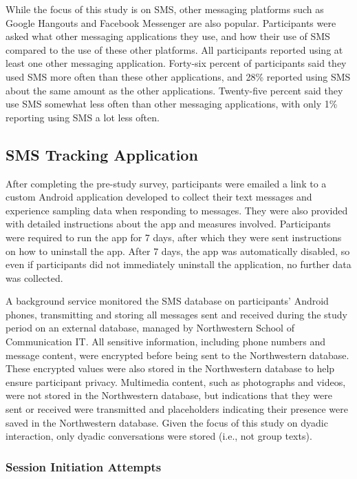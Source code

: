 \documentclass[12pt]{nuthesis}	%
\begin{document}
While the focus of this study is on SMS, other messaging platforms such as Google Hangouts and Facebook Messenger are also popular. Participants were asked what other messaging applications they use, and how their use of SMS compared to the use of these other platforms. All participants reported using at least one other messaging application. Forty-six percent of participants said they used SMS more often than these other applications, and 28\% reported using SMS about the same amount as the other applications. Twenty-five percent said they use SMS somewhat less often than other messaging applications, with only 1\% reporting using SMS a lot less often.

\subsection{SMS Tracking Application}

After completing the pre-study survey, participants were emailed a link to a custom Android application developed to collect their text messages and experience sampling data when responding to messages. They were also provided with detailed instructions about the app and measures involved. Participants were required to run the app for 7 days, after which they were sent instructions on how to uninstall the app. After 7 days, the app was automatically disabled, so even if participants did not immediately uninstall the application, no further data was collected.

A background service monitored the SMS database on participants' Android phones, transmitting and storing all messages sent and received during the study period on an external database, managed by Northwestern School of Communication IT. All sensitive information, including phone numbers and message content, were encrypted before being sent to the Northwestern database. These encrypted values were also stored in the Northwestern database to help ensure participant privacy. Multimedia content, such as photographs and videos, were not stored in the Northwestern database, but indications that they were sent or received were transmitted and placeholders indicating their presence were saved in the Northwestern database. Given the focus of this study on dyadic interaction, only dyadic conversations were stored (i.e., not group texts).

\subsubsection{Session Initiation Attempts}
\end{document}
